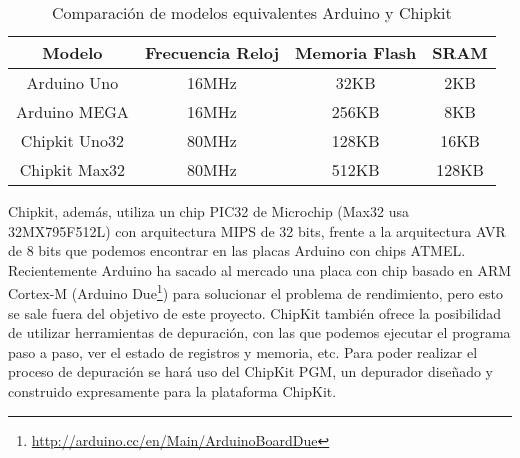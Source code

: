 \begin{table}[H]
\begin{center}
\begin{tabular}{| c || c | c | c |}
    \hline
    Modelo & Frecuencia Reloj & Memoria Flash & SRAM\\
    \hline
    Arduino Uno   & 16MHz & 32KB  & 2KB   \\
    \hline
    Arduino MEGA  & 16MHz & 256KB & 8KB   \\
    \hline
    Chipkit Uno32 & 80MHz & 128KB & 16KB  \\
    \hline
    Chipkit Max32 & 80MHz & 512KB & 128KB \\
    \hline
  \end{tabular}
\end{center}
\caption{Comparación de modelos equivalentes Arduino y Chipkit}
\label{tab:arduino}
\end{table}

Chipkit, además, utiliza un chip PIC32 de Microchip (Max32 usa 32MX795F512L) con arquitectura MIPS de 32 bits, frente a la arquitectura AVR de 8 bits que podemos encontrar en las placas Arduino con chips ATMEL. Recientemente Arduino ha sacado al mercado una placa con chip basado en ARM Cortex-M (Arduino Due\footnote{\url{http://arduino.cc/en/Main/ArduinoBoardDue}}) para solucionar el problema de rendimiento, pero esto se sale fuera del objetivo de este proyecto. ChipKit también ofrece la posibilidad de utilizar herramientas de depuración, con las que podemos ejecutar el programa paso a paso, ver el estado de registros y memoria, etc. Para poder realizar el proceso de depuración se hará uso del ChipKit PGM, un depurador diseñado y construido expresamente para la plataforma ChipKit.

